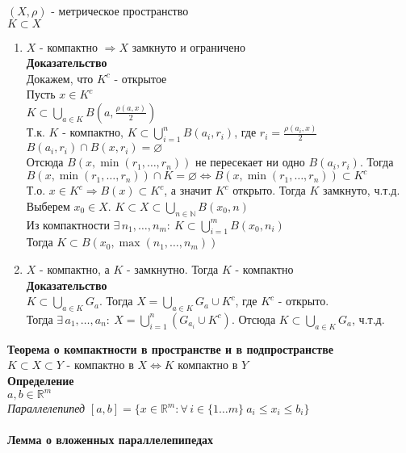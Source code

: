 \documentclass[12pt]{article}
\begin{document}
$(X, \rho)$ - метрическое пространство\\
$K \subset X$
\begin{enumerate}
    \item $X$ - компактно $\Rightarrow X$ замкнуто и ограничено\\
    \textbf{Доказательство}\\
    Докажем, что $K^c$ - открытое\\
    Пусть $x \in K^c$\\
    $K \subset \bigcup_{a\in K} B(a, \frac{\rho(a,x)}2)$\\
    Т.к. $K$ - компактно, $K \subset \bigcup_{i=1}^n B(a_i,r_i)$, где $r_i=\frac{\rho(a_i,x)}2$\\
    $B(a_i,r_i) \cap B(x,r_i) = \varnothing$\\
    Отсюда $B(x, \min(r_1,\ldots,r_n))$ не пересекает ни одно $B(a_i,r_i)$. Тогда $B(x,\min(r_1,\ldots,r_n)) \cap K = \varnothing \Leftrightarrow B(x,\min(r_1,\ldots,r_n)) \subset K^c$\\
    Т.о. $x \in K^c \Rightarrow B(x) \subset K^c$, а значит $K^c$ открыто. Тогда $K$ замкнуто, ч.т.д.
    Выберем $x_0 \in X$. $K \subset X \subset \bigcup_{n\in \mathbb{N}}B(x_0,n)$\\
    Из компактности $\exists\,n_1,\ldots,n_m:\ K \subset \bigcup_{i=1}^m B(x_0, n_i)$\\
    Тогда $K \subset B(x_0,\max(n_1,\ldots,n_m))$
    \item $X$ - компактно, а $K$ - замкнутно. Тогда $K$ - компактно\\
    \textbf{Доказательство}\\
    $K \subset \bigcup_{a\in K} G_a$. Тогда $X = \bigcup_{a\in K} G_a \cup K^c$, где $K^c$ - открыто.\\
    Тогда $\exists\,a_1,\ldots,a_n:\ X = \bigcup_{i=1}^n (G_{a_i} \cup K^c)$. Отсюда $K \subset \bigcup_{a\in K} G_a$, ч.т.д.
\end{enumerate}
\textbf{Теорема о компактности в пространстве и в подпространстве}\\
$K \subset X \subset Y$ - компактно в $X \Leftrightarrow K$ компактно в $Y$\\
\textbf{Определение}\\
$a,b\in \mathbb{R}^m$\\
\textit{Параллелепипед} $[a,b]=\{x\in\mathbb{R}^m: \forall\,i\in\{1\ldots m\}\ a_i\leq x_i\leq b_i\}$\\\\
\textbf{Лемма о вложенных параллелепипедах}\\
\end{document}
